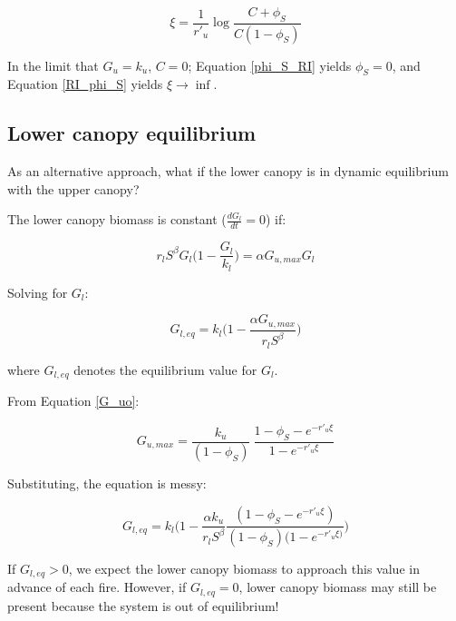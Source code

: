 \documentclass{article}
\begin{document}
\begin{equation}
\xi   =  \frac{1}{r'_u}\log \frac{C  +\phi_S } {C(1 - \phi_S)}
 \label{RI_phi_S}
 \end{equation}

In the limit that  $G_u = k_u$, $C=0$;
 Equation \ref{phi_S_RI} yields $\phi_S = 0$,  and Equation \ref{RI_phi_S} yields $\xi \rightarrow \inf$.







  \subsection*{Lower canopy equilibrium}

As an alternative approach, what if the lower canopy is in dynamic equilibrium with the upper canopy?

The lower canopy biomass is constant ($\frac{d G_l}{dt}  = 0$) if:

\begin{equation}
 r_l S^\beta G_l \bigg(1-\frac{G_l}{k_l}\bigg) = \alpha G_{u,max} G_l
\end{equation}


Solving for $G_l$:

\begin{equation}
G_{l,eq}   = k_l\bigg(1 - \frac{ \alpha G_{u,max} }{ r_l S^\beta}\bigg)
\label{G_l_eq}
\end{equation}

where $G_{l,eq} $ denotes the equilibrium value for $G_{l} $.

From Equation \ref{G_uo}:

\begin{equation}
  G_{u,max} = \frac{ k_u}{(1-\phi_S)} \   \frac{1- \phi_S - e^{-r'_u \xi} }{1 - e^{-r'_u \xi}}
\end{equation}

Substituting, the equation is messy:

\begin{equation}
G_{l,eq}   = k_l\bigg(1 - \frac{ \alpha  k_u }{ r_l S^\beta}   \frac{(1- \phi_S - e^{-r'_u \xi}) }{(1-\phi_S)(1 - e^{-r'_u \xi)}}   \bigg)
\end{equation}

If $G_{l,eq}> 0 $, we expect the lower canopy biomass to approach this value in advance of each fire.
However, if $G_{l,eq}= 0 $, lower canopy biomass may still be present because the system is out of equilibrium!
\end{document}
